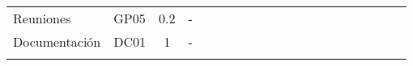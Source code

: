 \begin{longtable}[c]{llclllllllllllllllll}
        \multicolumn{1}{|l|}{Reuniones}                                                       & \multicolumn{1}{l|}{GP05}                                                      & \multicolumn{1}{c|}{0.2}                                                         & \multicolumn{1}{l|}{-}                                                               &                                 &                                 &                                 &                                 &                                 &                                 &                                 &                                 & \cellcolor[HTML]{EF8787}        &                                 &                                 &                                 &                                 &                                 & \multicolumn{1}{l|}{}                         &  \\ \cline{1-4}
        \multicolumn{1}{|l|}{Documentación}                                                   & \multicolumn{1}{l|}{DC01}                                                      & \multicolumn{1}{c|}{1}                                                           & \multicolumn{1}{l|}{-}                                                               & \cellcolor[HTML]{C9C9C9}        & \cellcolor[HTML]{C9C9C9}        & \cellcolor[HTML]{C9C9C9}        & \cellcolor[HTML]{C9C9C9}        & \cellcolor[HTML]{C9C9C9}        &                                 &                                 &                                 &                                 &                                 &                                 &                                 &                                 &                                 & \multicolumn{1}{l|}{}                         &  \\ \cline{1-19}
        \multicolumn{4}{|l|}{}                                                                                                                                                                                                                                                                                                                           & \multicolumn{15}{l|}{}                                                                                                                                                                                                                                                                                                                                                                                                                                                                                                                    &  \\ \cline{1-19}

\end{longtable}
